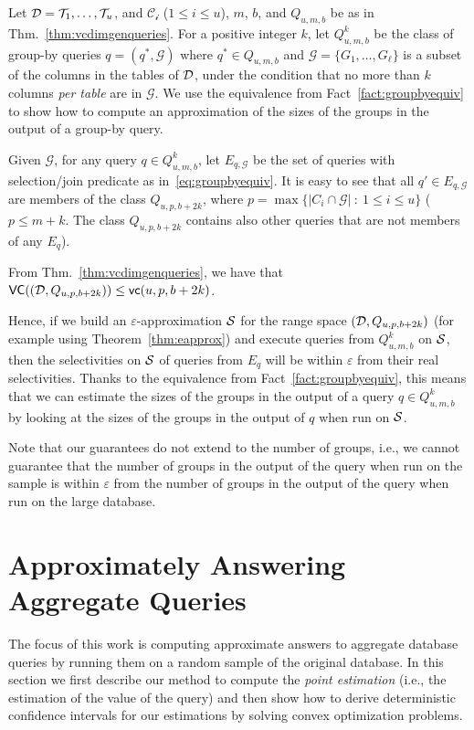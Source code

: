 Let ${\cal D}={{\cal T}_1,\dots,{\cal T}_u}$, and $\mathcal{C_i}$ ($1\le i \le u$), $m$, $b$,
and $Q_{u,m,b}$ be as in Thm.~\ref{thm:vcdimgenqueries}. For a positive integer
$k$, let $Q^k_{u,m,b}$ be the class of group-by queries $q=(q^*,\mathcal{G})$
where $q^*\in Q_{u,m,b}$ and $\mathcal{G}=\{G_1,\dots,G_\ell\}$ is a subset of
the columns in the tables of ${\cal D}$, under the condition that no more than $k$
columns \emph{per table} are in $\mathcal{G}$. We use the equivalence from
Fact~\ref{fact:groupbyequiv} to show how to compute an approximation of the
sizes of the groups in the output of a group-by query. 

Given $\mathcal{G}$, for any query $q\in Q^k_{u,m,b}$, let $E_{q,\mathcal{G}}$
be the set of queries with selection/join predicate as
in~\eqref{eq:groupbyequiv}. It is easy to see that all $q'\in E_{q,\mathcal{G}}$
are members of the class $Q_{u,p,b+2k}$, where $p=\max\{|C_i\cap\mathcal{G}|
~:~ 1\le i\le u\}$ ($p\le m+k$. The class $Q_{u,p,b+2k}$ contains also other
queries that are not members of any $E_q$). 
\begin{fact}
From Thm.~\ref{thm:vcdimgenqueries}, we have that $\mathsf{VC}(({\cal D},Q_{u,p,b+2k}))\le\mathsf{vc}(u,p,b+2k)$.
\end{fact}

Hence, if we build an $\varepsilon$-approximation ${\cal S}$ for the range space
$({\cal D},Q_{u,p,b+2k})$ (for example using Theorem~\ref{thm:eapprox}) and execute
queries from $Q^k_{u,m,b}$ on ${\cal S}$, then the selectivities on ${\cal S}$ of queries
from $E_q$ will be within $\varepsilon$ from their real selectivities. Thanks to
the equivalence from Fact~\ref{fact:groupbyequiv}, this means that we can
estimate the sizes of the groups in the output of a query $q\in Q^k_{u,m,b}$ by
looking at the sizes of the groups in the output of $q$ when run on ${\cal S}$.


Note that our guarantees do not extend to the number of groups, i.e., we cannot
guarantee that the number of groups in the output of the query when run on the
sample is within $\varepsilon$ from the number of groups in the output of the
query when run on the large database.

\section{Approximately Answering Aggregate Queries}\label{sec:aggreg}
The focus of this work is computing approximate answers to aggregate database
queries by running them on a random sample of the original database. In this
section we first describe our method to compute the \emph{point estimation}
(i.e., the estimation of the value of the query) and then show how to derive
deterministic confidence intervals for our estimations by solving convex
optimization problems.

